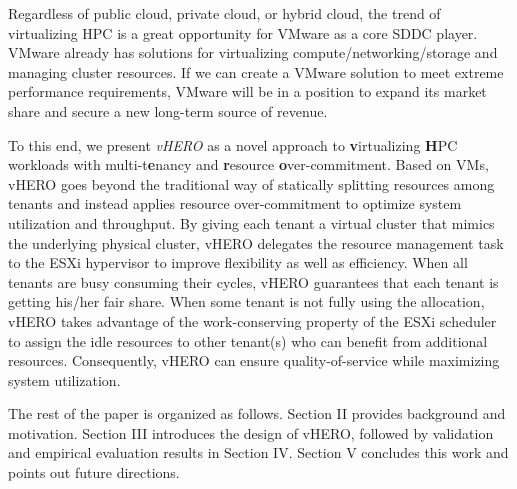 Regardless of public cloud, private cloud, or hybrid cloud, the trend of virtualizing HPC is a great opportunity 
for VMware as a core SDDC player. VMware already has solutions for virtualizing compute/networking/storage  and  
managing cluster resources. If we can create a VMware solution to meet extreme performance requirements, VMware will be in a position to 
expand its market share and secure a new long-term source of revenue. 


To this end, we present \textit{vHERO} as a novel approach to  \textbf{v}irtualizing  
 \textbf{H}PC workloads with multi-t\textbf{e}nancy and  \textbf{r}esource  \textbf{o}ver-commitment. Based on VMs, vHERO goes beyond the traditional way of 
statically splitting resources among tenants and instead applies resource over-commitment to optimize 
system utilization and throughput. By giving each tenant a virtual cluster that mimics the 
underlying physical cluster, vHERO delegates the resource management task 
to the ESXi hypervisor to improve flexibility as well as efficiency. When all tenants are busy consuming their cycles, 
vHERO guarantees that each tenant is getting his/her fair share. When 
some tenant is not fully using the allocation, vHERO takes advantage of the work-conserving 
property of the ESXi scheduler to assign the idle resources to other tenant(s) who can benefit 
from additional resources. Consequently, vHERO can ensure quality-of-service while maximizing 
system utilization. 

The rest of the paper is organized as follows. 
Section II provides background and motivation. Section III introduces the design of vHERO, followed by validation 
and empirical evaluation results in Section IV. Section V concludes this work and points out future directions.